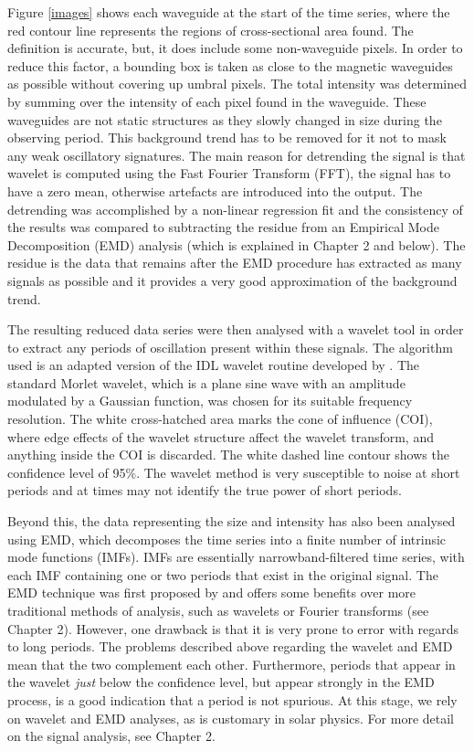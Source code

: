 	Figure \ref{images} shows each waveguide at the start of the time series, where the red contour line represents the regions of cross-sectional area found.
	The definition is accurate, but, it does include some non-waveguide pixels.
	In order to reduce this factor, a bounding box is taken as close to the magnetic waveguides as possible without covering up umbral pixels.
	The total intensity was determined by summing over the intensity of each pixel found in the waveguide.
	These waveguides are not static structures as they slowly changed in size during the observing period.
	This background trend has to be removed for it not to mask any weak oscillatory signatures.
	The main reason for detrending the signal is that wavelet is computed using the Fast Fourier Transform (FFT), the signal has to have a zero mean, otherwise artefacts are introduced into the output.
	The detrending was accomplished by a non-linear regression fit and the consistency of the results was compared to subtracting the residue from an Empirical Mode Decomposition (EMD) analysis (which is explained in Chapter 2 and below).
	The residue is the data that remains after the EMD procedure has extracted as many signals as possible and it provides a very good approximation of the background trend.
 
	The resulting reduced data series were then analysed with a wavelet tool in order to extract any periods of oscillation present within these signals.
	The algorithm used is an adapted version of the IDL wavelet routine developed by \citet{torrence}.
	The standard Morlet wavelet, which is a plane sine wave with an amplitude modulated by a Gaussian function, was chosen for its suitable frequency resolution.
	The white cross-hatched area marks the cone of influence (COI), where edge effects of the wavelet structure affect the wavelet transform, and anything inside the COI is discarded.
	The white dashed line contour shows the confidence level of 95\%.
	The wavelet method is very susceptible to noise at short periods and at times may not identify the true power of short periods.
	
	Beyond this, the data representing the size and intensity has also been analysed using EMD, which decomposes the time series into a finite number of intrinsic mode functions (IMFs).
	IMFs are essentially narrowband-filtered time series, with each IMF containing one or two periods that exist in the original signal.
	The EMD technique was first proposed by \citet{huang} and offers some benefits over more traditional methods of analysis, such as wavelets or Fourier transforms (see Chapter 2).
	However, one drawback is that it is very prone to error with regards to long periods.
	The problems described above regarding the wavelet and EMD mean that the two complement each other.
	Furthermore, periods that appear in the wavelet \textit{just} below the confidence level, but appear strongly in the EMD process, is a good indication that a period is not spurious.
	At this stage, we rely on wavelet and EMD analyses, as is customary in solar physics.
	For more detail on the signal analysis, see Chapter 2.

